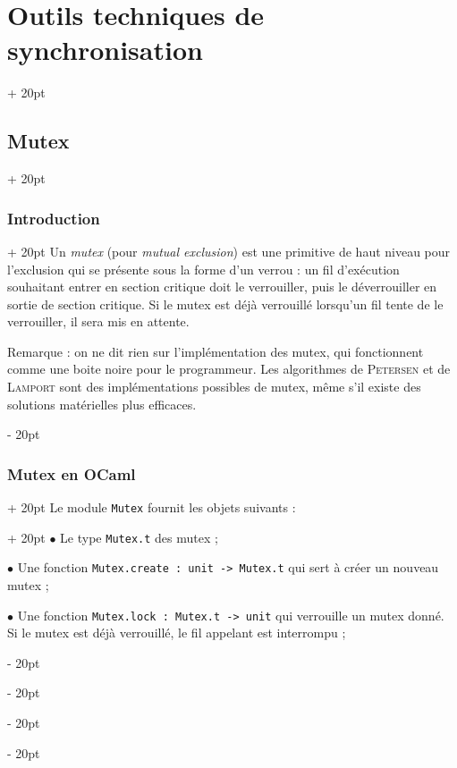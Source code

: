 \documentclass[a4paper, 12pt, twoside]{article}
\newcommand{\ind}[1][20pt]{\advance\leftskip + #1}
\newcommand{\deind}[1][20pt]{\advance\leftskip - #1}
\newenvironment{indt}[2][20pt]{#2 \par \ind[#1]}{\par \deind} %
\begin{document}
    \begin{indt}{\section{Outils techniques de synchronisation}}
        \begin{indt}{\subsection{Mutex}}
            \begin{indt}{\subsubsection{Introduction}}
                Un \emph{mutex} (pour \textit{mutual exclusion}) est une primitive de haut niveau pour l'exclusion qui se présente sous la forme d'un verrou : un fil d'exécution souhaitant entrer en section critique doit le verrouiller, puis le déverrouiller en sortie de section critique.
                Si le mutex est déjà verrouillé lorsqu'un fil tente de le verrouiller, il sera mis en attente.

                \vspace{12pt}
                
                Remarque : on ne dit rien sur l'implémentation des mutex, qui fonctionnent comme une boite noire pour le programmeur. Les algorithmes de \textsc{Petersen} et de \textsc{Lamport} sont des implémentations possibles de mutex, même s'il existe des solutions matérielles plus efficaces.
            \end{indt}

            \vspace{12pt}
            
            \begin{indt}{\subsubsection{Mutex en OCaml}}
                \begin{indt}{Le module \texttt{Mutex} fournit les objets suivants :}
                    $\bullet$ Le type \texttt{Mutex.t} des mutex ;

                    $\bullet$ Une fonction \texttt{Mutex.create : unit -> Mutex.t} qui sert à créer un nouveau mutex ;

                    $\bullet$ Une fonction \texttt{Mutex.lock : Mutex.t -> unit} qui verrouille un mutex donné.
                    Si le mutex est déjà verrouillé, le fil appelant est interrompu ;


\end{indt}
\end{indt}
\end{indt}
\end{indt}
\end{document}
